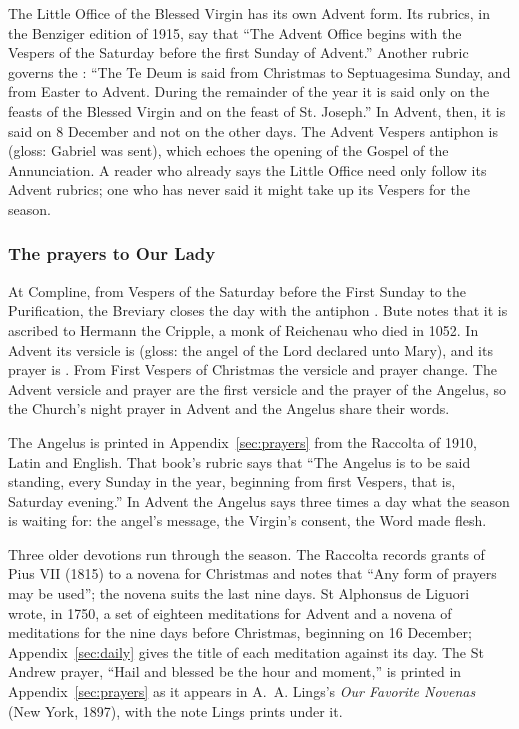 The Little Office of the Blessed Virgin has its own Advent form.
Its rubrics, in the Benziger edition of 1915, say that ``The Advent Office begins with the Vespers
of the Saturday before the first Sunday of Advent.'' Another rubric governs the :
``The Te Deum is said from Christmas to Septuagesima Sunday, and from Easter to Advent. During the
remainder of the year it is said only on the feasts of the Blessed Virgin and on the feast of St.
Joseph.'' In Advent, then, it is said on 8 December and not on the other days. The Advent Vespers
antiphon is  (gloss: Gabriel was sent), which echoes
the opening of the Gospel of the Annunciation. A reader who already says the Little Office need
only follow its Advent rubrics; one who has never said it might take up its Vespers for the
season.

\subsubsection{The prayers to Our Lady}

At Compline, from Vespers of the Saturday before the First Sunday to the Purification, the
Breviary closes the day with the antiphon . Bute notes that it is
ascribed to Hermann the Cripple, a monk of Reichenau who died in 1052. In Advent its versicle is
 (gloss: the angel of the Lord declared unto Mary), and its
prayer is . From First Vespers of Christmas the versicle and prayer change. The
Advent versicle and prayer are the first versicle and the prayer of the Angelus, so the Church's
night prayer in Advent and the Angelus share their words.

The Angelus is printed in Appendix~\ref{sec:prayers} from the Raccolta of 1910, Latin and English.
That book's rubric says that ``The Angelus is to be said standing, every Sunday in the year,
beginning from first Vespers, that is, Saturday evening.'' In Advent the Angelus says three times
a day what the season is waiting for: the angel's message, the Virgin's consent, the Word made
flesh.

Three older devotions run through the season. The Raccolta records grants of Pius VII (1815)
to a novena for Christmas and notes that ``Any form of prayers may be used''; the novena suits the
last nine days.
St Alphonsus de Liguori wrote, in 1750, a set of eighteen meditations for Advent and a novena of
meditations for the nine days before Christmas, beginning on 16 December; Appendix~\ref{sec:daily}
gives the title of each meditation against its day. The St Andrew prayer, ``Hail and blessed be the
hour and moment,'' is printed in Appendix~\ref{sec:prayers} as it appears in A.~A. Lings's
\textit{Our Favorite Novenas} (New York, 1897), with the note Lings prints under it.

